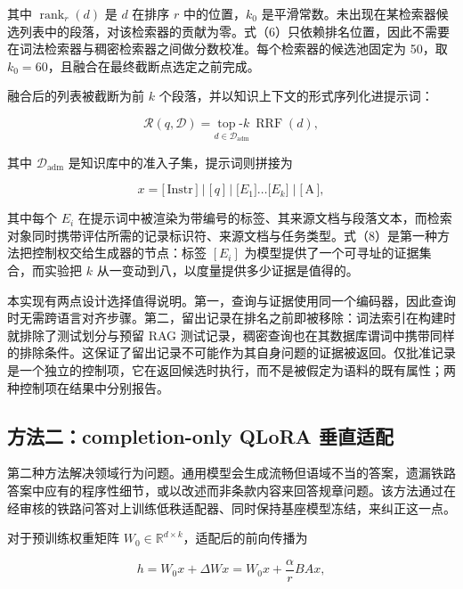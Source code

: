 \documentclass{article}
\DeclareMathOperator{\rank}{rank}
\begin{document}
其中 $\rank_r(d)$ 是 $d$ 在排序 $r$ 中的位置，$k_0$ 是平滑常数。未出现在某检索器候选列表中的段落，对该检索器的贡献为零。式（6）只依赖排名位置，因此不需要在词法检索器与稠密检索器之间做分数校准。每个检索器的候选池固定为 50，取 $k_0=60$，且融合在最终截断点选定之前完成。

融合后的列表被截断为前 $k$ 个段落，并以知识上下文的形式序列化进提示词：

\begin{equation}
\mathcal{R}(q,\mathcal{D})=\underset{d\in\mathcal{D}_{\mathrm{adm}}}{\operatorname{top}\text{-}k}\ \operatorname{RRF}(d),
\end{equation}

其中 $\mathcal{D}_{\mathrm{adm}}$ 是知识库中的准入子集，提示词则拼接为

\begin{equation}
x=\big[\,\text{Instr}\,\big]\;\big|\;\big[\,q\,\big]\;\big|\;\big[E_1\big]\ldots\big[E_k\big]\;\big|\;\big[\,\text{A}\,\big],
\end{equation}

其中每个 $E_i$ 在提示词中被渲染为带编号的标签、其来源文档与段落文本，而检索对象同时携带评估所需的记录标识符、来源文档与任务类型。式（8）是第一种方法把控制权交给生成器的节点：标签 $[E_i]$ 为模型提供了一个可寻址的证据集合，而实验把 $k$ 从一变动到八，以度量提供多少证据是值得的。

本实现有两点设计选择值得说明。第一，查询与证据使用同一个编码器，因此查询时无需跨语言对齐步骤。第二，留出记录在排名之前即被移除：词法索引在构建时就排除了测试划分与预留 RAG 测试记录，稠密查询也在其数据库谓词中携带同样的排除条件。这保证了留出记录不可能作为其自身问题的证据被返回。仅批准记录是一个独立的控制项，它在返回候选时执行，而不是被假定为语料的既有属性；两种控制项在结果中分别报告。

\subsection{方法二：completion-only QLoRA 垂直适配}

第二种方法解决领域行为问题。通用模型会生成流畅但语域不当的答案，遗漏铁路答案中应有的程序性细节，或以改述而非条款内容来回答规章问题。该方法通过在经审核的铁路问答对上训练低秩适配器、同时保持基座模型冻结，来纠正这一点。

对于预训练权重矩阵 $W_0\in\mathbb{R}^{d\times k}$，适配后的前向传播为

\begin{equation}
h=W_0x+\Delta Wx=W_0x+\frac{\alpha}{r}BAx,
\end{equation}
\end{document}
